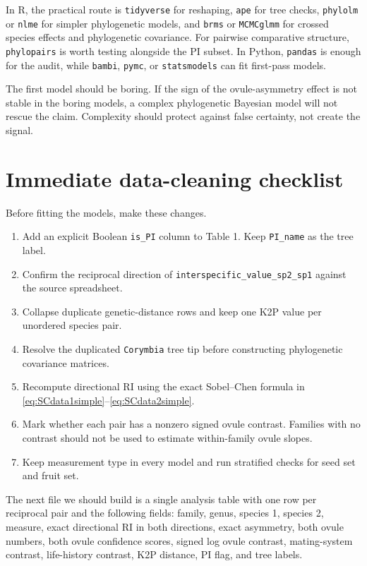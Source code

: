 \documentclass[12pt]{article}
\begin{document}
In R, the practical route is \texttt{tidyverse} for reshaping, \texttt{ape} for tree checks, \texttt{phylolm} or \texttt{nlme} for simpler phylogenetic models, and \texttt{brms} or \texttt{MCMCglmm} for crossed species effects and phylogenetic covariance. For pairwise comparative structure, \texttt{phylopairs} is worth testing alongside the PI subset. In Python, \texttt{pandas} is enough for the audit, while \texttt{bambi}, \texttt{pymc}, or \texttt{statsmodels} can fit first-pass models.

\begin{cautionbox}
The first model should be boring. If the sign of the ovule-asymmetry effect is not stable in the boring models, a complex phylogenetic Bayesian model will not rescue the claim. Complexity should protect against false certainty, not create the signal.
\end{cautionbox}

\section{Immediate data-cleaning checklist}

Before fitting the models, make these changes.

\begin{enumerate}
\item Add an explicit Boolean \texttt{is\_PI} column to Table 1. Keep \texttt{PI\_name} as the tree label.
\item Confirm the reciprocal direction of \texttt{interspecific\_value\_sp2\_sp1} against the source spreadsheet.
\item Collapse duplicate genetic-distance rows and keep one K2P value per unordered species pair.
\item Resolve the duplicated \texttt{Corymbia} tree tip before constructing phylogenetic covariance matrices.
\item Recompute directional RI using the exact Sobel--Chen formula in \eqref{eq:SCdata1simple}--\eqref{eq:SCdata2simple}.
\item Mark whether each pair has a nonzero signed ovule contrast. Families with no contrast should not be used to estimate within-family ovule slopes.
\item Keep measurement type in every model and run stratified checks for seed set and fruit set.
\end{enumerate}

\begin{conclusionbox}
The next file we should build is a single analysis table with one row per reciprocal pair and the following fields: family, genus, species 1, species 2, measure, exact directional RI in both directions, exact asymmetry, both ovule numbers, both ovule confidence scores, signed log ovule contrast, mating-system contrast, life-history contrast, K2P distance, PI flag, and tree labels.
\end{conclusionbox}
\end{document}
